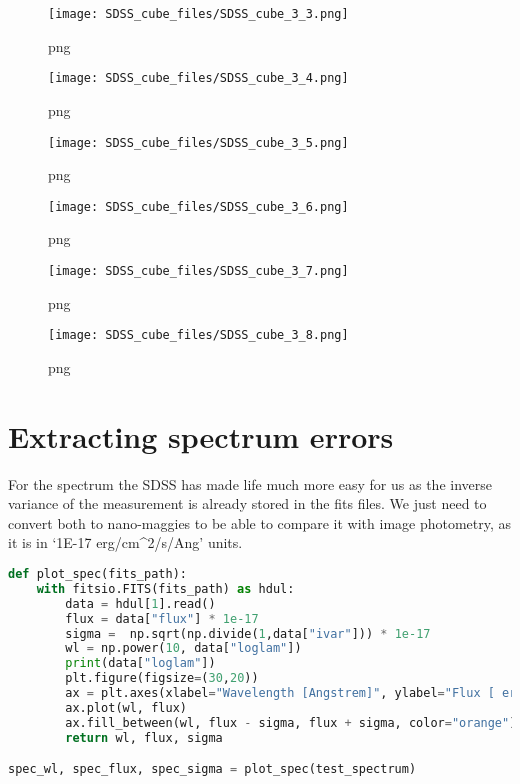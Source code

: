\begin{figure}
\centering
\texttt{[image: SDSS\_cube\_files/SDSS\_cube\_3\_3.png]}
\caption{png}
\end{figure}

\begin{figure}
\centering
\texttt{[image: SDSS\_cube\_files/SDSS\_cube\_3\_4.png]}
\caption{png}
\end{figure}

\begin{figure}
\centering
\texttt{[image: SDSS\_cube\_files/SDSS\_cube\_3\_5.png]}
\caption{png}
\end{figure}

\begin{figure}
\centering
\texttt{[image: SDSS\_cube\_files/SDSS\_cube\_3\_6.png]}
\caption{png}
\end{figure}

\begin{figure}
\centering
\texttt{[image: SDSS\_cube\_files/SDSS\_cube\_3\_7.png]}
\caption{png}
\end{figure}

\begin{figure}
\centering
\texttt{[image: SDSS\_cube\_files/SDSS\_cube\_3\_8.png]}
\caption{png}
\end{figure}

\section{Extracting spectrum errors}\label{extracting-spectrum-errors}

For the spectrum the SDSS has made life much more easy for us as the
inverse variance of the measurement is already stored in the fits files.
We just need to convert both to nano-maggies to be able to compare it
with image photometry, as it is in `1E-17 erg/cm\^{}2/s/Ang' units.

\begin{lstlisting}[language=Python]
def plot_spec(fits_path):
    with fitsio.FITS(fits_path) as hdul:
        data = hdul[1].read()
        flux = data["flux"] * 1e-17
        sigma =  np.sqrt(np.divide(1,data["ivar"])) * 1e-17
        wl = np.power(10, data["loglam"])
        print(data["loglam"])
        plt.figure(figsize=(30,20))
        ax = plt.axes(xlabel="Wavelength [Angstrem]", ylabel="Flux [ erg/cm^2/s/Ang]")
        ax.plot(wl, flux)
        ax.fill_between(wl, flux - sigma, flux + sigma, color="orange")
        return wl, flux, sigma

spec_wl, spec_flux, spec_sigma = plot_spec(test_spectrum)
\end{lstlisting}


